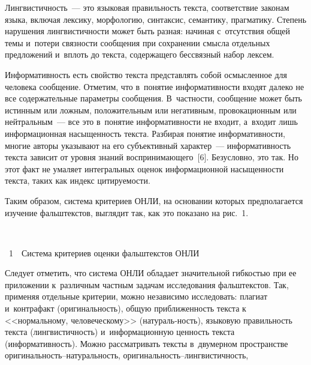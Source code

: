 \begin{multicols}{2}
   Лингвистичность~--- это языковая правильность текста, соответствие
законам языка, включая лексику, морфологию, синтаксис, семантику,
прагматику. Степень нарушения лингвистичности может быть разная:
начиная с~отсутствия общей темы и~потери связности сообщения при
сохранении смысла отдельных предложений и~вплоть до текста,
содержащего бессвязный набор лексем.

   Информативность есть свойство текста представлять собой осмысленное
для человека сообщение. Отметим, что в~понятие информативности входят
далеко не все содержательные параметры сообщения. В~част\-ности,
сообщение может быть истинным или ложным, положительным или
негативным, провокационным или нейтральным~--- все это в~понятие
информативности не входит, а~входит лишь информационная насыщенность
текста. Разбирая понятие информативности, многие авторы указывают на его
субъективный характер~--- информативность текста зависит от уровня
знаний воспринимающего~[6]. Безусловно, это так. Но этот факт не умаляет
интегральных оценок информационной насыщенности текста, таких как
индекс цитируемости.

   Таким образом, система критериев ОНЛИ, на основании которых
предполагается изучение фальш\-текс\-тов, выглядит так, как это показано на
рис.~1.

\begin{center}  %
\vspace*{12pt}
 \mbox{%
 \epsfxsize=73.279mm
 }

 \vspace*{11pt}


{{\figurename~1}\ \ \small{Система критериев оценки фальштекстов ОНЛИ}}
 \end{center}

\vspace*{12pt}

\addtocounter{figure}{1}


   Следует отметить, что система ОНЛИ обладает значительной гибкостью
при ее приложении к~различным частным задачам исследования
фальш\-текстов.
Так, применяя отдельные критерии, \mbox{мож\-но} независимо
исследовать: плагиат и~контрафакт (оригинальность), общую
приближенность текста к <<нормальному, человеческому>> (натураль-\linebreak ность),
языковую правильность текста (лингви\-стичность) и~информационную
ценность текста (информативность). Можно рассматривать текс\-ты
в~двумерном пространстве ори\-ги\-наль\-ность--на\-ту\-раль\-ность,
   ори\-ги\-наль\-ность--лингви\-стич\-ность,\linebreak\vspace*{-12pt}


\end{multicols}
